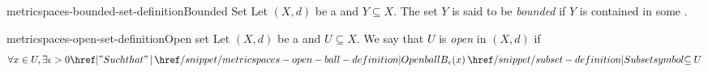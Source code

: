 \documentclass[preview]{standalone}
\begin{document}
\begin{snippetdefinition}{metricspaces-bounded-set-definition}{Bounded Set}
    Let \((X, d)\) be a \metricspace and \(Y \subseteq X\).
    The set \(Y\) is said to be \textit{bounded} if \(Y\)
    is contained in some \openball.
\end{snippetdefinition}

\begin{snippetdefinition}{metricspaces-open-set-definition}{Open set}
    Let \((X, d)\) be a \metricspace and \(U \subseteq X\).
    We say that \(U\) is \textit{open} in \((X, d)\) if
    \[ \forall x \in U, \exists \epsilon > 0 \suchthat \ball_\epsilon(x) \subseteq U\]
\end{snippetdefinition}
\end{document}

